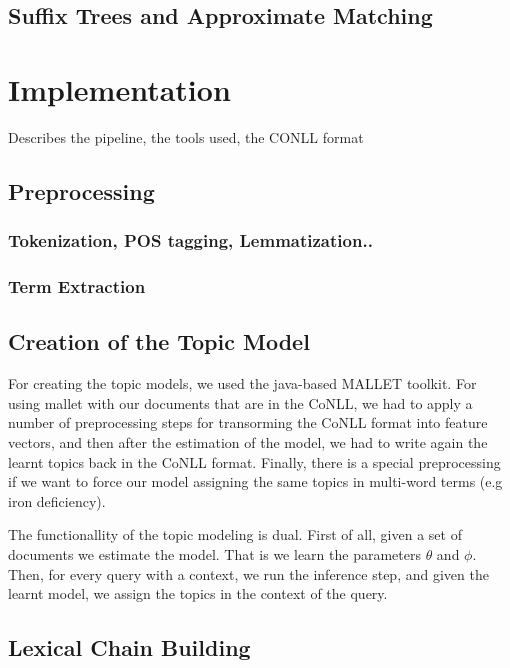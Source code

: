 \documentclass[11pt, a4paper, abstraction]{scrartcl}
\begin{document}
\subsection{Suffix Trees and Approximate Matching}

\section{Implementation}

Describes the pipeline, the tools used, the CONLL format

\subsection{Preprocessing}

\subsubsection{Tokenization, POS tagging, Lemmatization..}
\subsubsection{Term Extraction}

\subsection{Creation of the Topic Model}

For creating the topic models, we used the java-based MALLET toolkit. For using mallet with our documents that are in the CoNLL, we had to apply a number of preprocessing steps for transorming the CoNLL format into feature vectors, and then after the estimation of the model, we had to write again the learnt topics back in the CoNLL format. Finally, there is a special preprocessing if we want to force our model assigning the same topics in multi-word terms (e.g iron deficiency).

The functionallity of the topic modeling is dual. First of all, given a set of documents we estimate the model. That is we  learn the parameters $\theta$ and $\phi$. Then, for every query with a context, we run the inference step, and given the learnt model, we assign the topics in the context of the query. 

\subsection{Lexical Chain Building}
\end{document}
